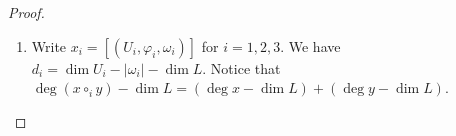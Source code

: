\documentclass[10pt]{amsart}
\numberwithin{equation}{section}
\theoremstyle{plain}
\theoremstyle{definition}
\theoremstyle{remark}
\numberwithin{equation}{section}
\newcommand{\dR}{\textup{dR}}
\newcommand{\fiberprod}[2]{\,_{#1}\!\!\times_{#2} }
\newcommand{\conc}{\textup{conc}^\mathscr{L}}
\begin{document}
{\begin{proof}
\begin{enumerate}
\begin{align*}
		\end{align*}
		Now 
		\begin{align*}
			(\partial^\dR x)\circ_i y =(-1)^{(d+1)|\omega_2|} (-1)^{|\omega_1|+1}(U_1\fiberprod{i}{0}U_2, \conc\circ (\varphi_1\times \varphi_2), d\omega_1\times \omega_2)
		\end{align*}
		and \begin{align*}
			x\circ_i (\partial^\dR y)= (-1)^{d(|\omega_2|+1)}(-1)^{|\omega_2|+1}(U_1\fiberprod{i}{0}U_2,\conc\circ (\varphi_1\times \varphi_2), \omega_1\times d\omega_2).
		\end{align*}
		Then comparing the exponents checks the signs of (1).
	\item Write $x_i=[(U_i, \varphi_i,\omega_i)]$ for $i=1,2,3$. We have $d_i = \dim U_i -|\omega_i| -\dim L$.
	Notice that $\deg(x\circ_i y) -\dim L=(\deg x-\dim L)+(\deg y - \dim L)$.
	

\end{enumerate}
\end{proof}}
\end{document}
